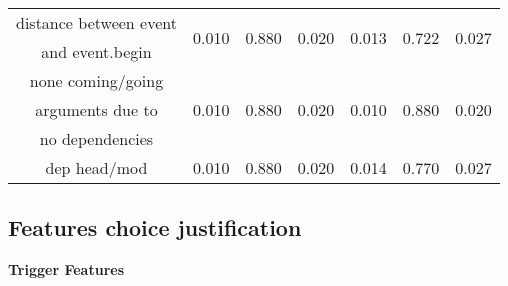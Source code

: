 \documentclass{article} %
\begin{document}
\begin{table}[!htp]
\begin{center}
\begin{tabular}{c c c c c c c }
distance between event & \multirow{2}{*}{0.010} & \multirow{2}{*}{0.880} & \multirow{2}{*}{0.020} & \multirow{2}{*}{0.013} & \multirow{2}{*}{0.722} & \multirow{2}{*}{0.027}\\
and event.begin\\
\hline

none coming/going & \multirow{3}{*}{0.010} & \multirow{3}{*}{0.880} & \multirow{3}{*}{0.020} & \multirow{3}{*}{0.010} & \multirow{3}{*}{0.880} & \multirow{3}{*}{0.020}\\
arguments due to\\
no dependencies\\
\hline
dep head/mod & 0.010 & 0.880 & 0.020 & 0.014 & 0.770 & 0.027\\
\end{tabular}
\end{center}
\end{table}

\subsection*{Features choice justification}

\textbf{Trigger Features}
\end{document}
